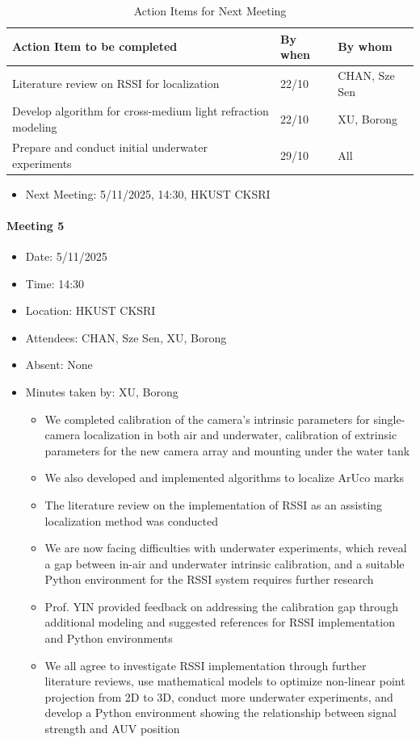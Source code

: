 \documentclass[11pt]{article}
\begin{document}
    \begin{longtable}[c]{|l|l|l|}
        \caption{Action Items for Next Meeting}\\
        \hline
        \textbf{Action Item to be completed} & \textbf{By when} & \textbf{By whom} \\
        \hline
        \endhead
        Literature review on RSSI for localization & 22/10 & CHAN, Sze Sen \\
        \hline
        Develop algorithm for cross-medium light refraction modeling & 22/10 & XU, Borong \\
        \hline
        Prepare and conduct initial underwater experiments & 29/10 & All \\
        \hline
    \end{longtable}
    \begin{itemize}
        \item Next Meeting: 5/11/2025, 14:30, HKUST CKSRI
    \end{itemize}
    \newpage
    \paragraph{Meeting 5}
    \begin{itemize}
        \item Date: 5/11/2025
        \item Time: 14:30
        \item Location: HKUST CKSRI
        \item Attendees: CHAN, Sze Sen, XU, Borong
        \item Absent: None
        \item Minutes taken by: XU, Borong
        \begin{itemize}
            \item We completed calibration of the camera's intrinsic parameters for single-camera localization in both air and underwater, calibration of extrinsic parameters for the new camera array and mounting under the water tank
            \item We also developed and implemented algorithms to localize ArUco marks
            \item The literature review on the implementation of RSSI as an assisting localization method was conducted
            \item We are now facing difficulties with underwater experiments, which reveal a gap between in-air and underwater intrinsic calibration, and a suitable Python environment for the RSSI system requires further research
            \item Prof. YIN provided feedback on addressing the calibration gap through additional modeling and suggested references for RSSI implementation and Python environments
            \item We all agree to investigate RSSI implementation through further literature reviews, use mathematical models to optimize non-linear point projection from 2D to 3D, conduct more underwater experiments, and develop a Python environment showing the relationship between signal strength and AUV position
        \end{itemize}
    \end{itemize}
    
\end{document}
